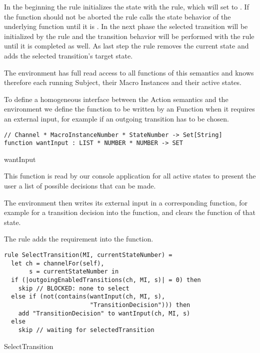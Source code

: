 In the beginning the  rule initializes the state with the
 rule, which will set  to
. If the function should not be aborted the 
rule calls the state behavior of the underlying function until it is
.
In the next phase the selected transition will be initialized by the
 rule and the transition behavior will be performed with
the  rule until it is completed as well. As last step
the  rule removes the current state and adds the selected
transition's target state.


The environment has full read access to all functions of this semantics and knows
therefore each running Subject, their Macro Instances and their active states.

To define a homogeneous interface between the Action semantics and the environment we
define the function  to be written by an Function when it
requires an external input, for example if an outgoing transition has to be chosen.



\begin{listing}[H]
\begin{verbatim}
// Channel * MacroInstanceNumber * StateNumber -> Set[String]
function wantInput : LIST * NUMBER * NUMBER -> SET
\end{verbatim}
\caption{wantInput}
\label{lst:shortasm:wantInput}
\end{listing}


This function is read by our console application for all active states
to present the user a list of possible decisions that can be made.

The environment then writes its external input in a corresponding function, for
example for a transition decision into the  function, and
clears the  function of that state.

The  rule adds the 
requirement into the  function.


\begin{listing}[H]
\begin{verbatim}
rule SelectTransition(MI, currentStateNumber) =
  let ch = channelFor(self),
       s = currentStateNumber in
  if (|outgoingEnabledTransitions(ch, MI, s)| = 0) then
    skip // BLOCKED: none to select
  else if (not(contains(wantInput(ch, MI, s),
                        "TransitionDecision"))) then
    add "TransitionDecision" to wantInput(ch, MI, s)
  else
    skip // waiting for selectedTransition
\end{verbatim}
\caption{SelectTransition}
\label{lst:shortasm:SelectTransition}
\end{listing}



